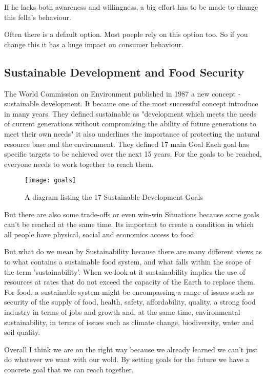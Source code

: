 If he lacks both awareness and willingness, a big effort has to be made to change this fella's
behaviour.

Often there is a default option. Most poeple rely on this option too. So if you change this it
has a huge impact on consumer behaviour.

\subsection{Sustainable Development
	and Food Security}
The World Commission on Environment published in 1987 a new concept - sustainable development. It became one of the most successful concept introduce in many years. They defined sustainable as "development which meets the needs of current generations without compromising the ability of future generations to meet their own needs" \cite{_our}it also underlines the importance of protecting the natural resource base and the environment. They defined 17 main Goal Each goal has specific targets to be achieved over the next 15 years. For the goals to be reached, everyone needs to work together to reach them.

\begin{figure}[H]	
	\centering
	\texttt{[image: goals]}
	\caption{A diagram listing the 17 Sustainable Development Goals}
	\label{fig:ha}
\end{figure}

But there are also some trade-offs or even win-win Situations because some goals can’t be reached at the same time.
Its important to create a condition in which all people have physical, social and economics access to food.

But what do we mean by Sustainability because there are many different views as to what contains a sustainable food system, and what falls within the scope of the term 'sustainability’. When we look at it sustainability implies the use of resources at rates that do not exceed the capacity of the Earth to replace them. For food, a sustainable system might be encompassing a range of issues such as security of the supply of food, health, safety, affordability, quality, a strong food industry in terms of jobs and growth and, at the same time, environmental sustainability, in terms of issues such as climate change, biodiversity, water and soil quality.

Overall I think we are on the right way because we already learned we can’t just do whatever we want with our wold. By setting goals for the future we have a concrete goal that we can reach together.
